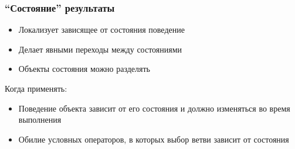 \documentclass[xetex,mathserif,serif]{beamer}
\begin{document}
    \begin{frame}
        \frametitle{``Состояние'' результаты}
        \begin{itemize}
            \item Локализует зависящее от состояния поведение
            \item Делает явными переходы между состояниями
            \item Объекты состояния можно разделять
        \end{itemize}
        Когда применять:
        \begin{itemize}
            \item Поведение объекта зависит от его состояния и должно изменяться во время выполнения
            \item Обилие условных операторов, в которых выбор ветви зависит от состояния
        \end{itemize}
    \end{frame}
\end{document}
